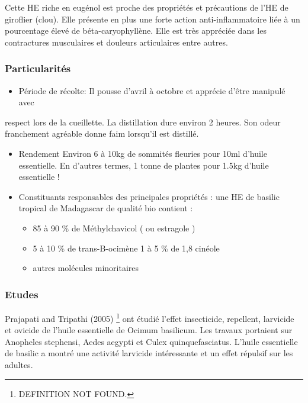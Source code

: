 \documentclass[12pt,a4wide]{article}
\begin{document}
Cette HE riche  en eugénol est proche  des propriétés et précautions  de l'HE de
giroflier (clou). Elle présente en plus une forte action anti-inflammatoire liée
à un pourcentage  élevé de béta-caryophyllène. Elle est très  appréciée dans les
contractures musculaires et douleurs articulaires entre autres.


\subsubsection{Particularités}
\label{sec-4-4-3}
\begin{itemize}
\item Période de récolte: Il pousse d'avril à octobre et apprécie d'être manipulé avec
\end{itemize}
respect lors de la cueillette. La  distillation dure environ 2 heures. Son odeur
franchement agréable donne  faim lorsqu'il est distillé.  

\begin{itemize}
\item Rendement  Environ   6  à  10kg   de  sommités  fleuries  pour   10ml  d'huile
essentielle. En d'autres termes, 1 tonne de plantes pour 1.5kg d'huile essentielle !

\item Constituants  responsables des  principales  propriétés :  une  HE de  basilic
tropical de Madagascar de qualité bio contient  : 
\begin{itemize}
\item 85  à 90  \%  de Méthylchavicol  ( ou  estragole  )
\item 5  à  10 \%  de trans-B-ocimène 1 à 5 \% de 1,8 cinéole
\item autres molécules minoritaires
\end{itemize}
\end{itemize}


\subsubsection{Etudes}
\label{sec-4-4-4}

Prajapati and  Tripathi (2005) \footnote{DEFINITION NOT FOUND.}  ont étudié l'effet  insecticide, repellent,
larvicide et  ovicide de l'huile  essentielle de Ocimum basilicum.   Les travaux
portaient  sur Anopheles  stephensi,  Aedes aegypti  et Culex  quinquefasciatus.
L'huile essentielle de  basilic a montré une activité  larvicide intéressante et
un effet répulsif sur les adultes.
\end{document}

